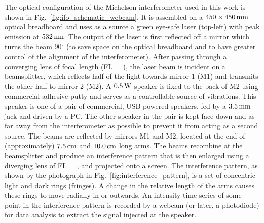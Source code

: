 \documentclass[paper-main.tex]{subfiles}
\begin{document}
The optical configuration of the Michelson interferometer used in this work is shown in Fig.~\ref{fig:ifo_schematic_webcam}.
It is assembled on a $450 \times 450 \,{\rm mm} $ optical breadboard and uses as a source a green eye-safe laser (top-left) with peak emission at $532\,{\rm nm}$.
The output of the laser is first reflected off a mirror which turns the beam $90^{\circ}$ (to save space on the optical breadboard and to have greater control of the alignment of the interferometer).
After passing through a converging lens of focal length (FL = ), the laser beam is incident on a beamsplitter, which reflects half of the light towards mirror 1 (M1) and transmits the other half to mirror 2 (M2). 
A $0.5\,{\rm W}$ speaker is fixed to the back of M2 using commercial adhesive putty and serves as a controllable source of vibrations. This speaker is one of a pair of commercial, USB-powered speakers, fed by a $3.5\,{\rm mm}$ jack and driven by a PC. The other speaker in the pair is kept face-down and as far away from the interferometer as possible to prevent it from acting as a second source.
The beams are reflected by mirrors M1 and M2, located at the end of (approximately) $7.5\,{\rm cm}$ and $10.0\,{\rm cm}$ long arms.
The beams recombine at the beamsplitter and produce an interference pattern that is then enlarged using a diverging lens of FL = , and projected onto a screen.
The interference pattern, as shown by the photograph in Fig.~\ref{fig:interference_pattern}, is a set of concentric light and dark rings (fringes). 
A change in the relative length of the arms causes these rings to move radially in or outwards.
An intensity time series of some point in the interference pattern is recorded by a webcam (or later, a photodiode) for data analysis to extract the signal injected at the speaker.
\end{document}
